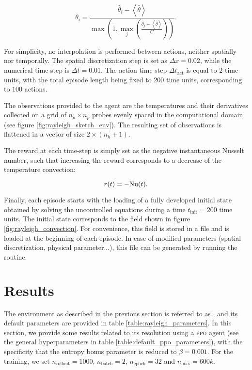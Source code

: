 \begin{equation}
	\theta_i = \frac{\hat{\theta}_i - \left< \hat{\theta} \right>}{\max \left( 1, \max_j \left( \frac{\hat{\theta}_j - \left< \hat{\theta} \right>}{C} \right) \right)}.
\end{equation}

For simplicity, no interpolation is performed between actions, neither spatially nor temporally. The spatial discretization step is set as $\Delta x = 0.02$, while the numerical time step is $\Delta t = 0.01$. The action time-step $\Delta t_\text{act}$ is equal to $2$ time units, with the total episode length being fixed to $200$ time units, corresponding to $100$ actions.



The observations provided to the agent are the temperatures and their derivatives collected on a grid of $n_p \times n_p$ probes evenly spaced in the computational domain (see figure \ref{fig:rayleigh_sketch_env}). The resulting set of observations is flattened in a vector of size $2 \times (n_h+1)$.

The reward at each time-step is simply set as the negative instantaneous Nusselt number, such that increasing the reward corresponds to a decrease of the temperature convection:

\begin{equation}
	r(t) = - \text{Nu} (t).
\end{equation}

Finally, each episode starts with the loading of a fully developed initial state obtained by solving the uncontrolled equations during a time $t_\text{init} = 200$ time units. The initial state corresponds to the field shown in figure \ref{fig:rayleigh_convection}. For convenience, this field is stored in a file and is loaded at the beginning of each episode. In case of modified parameters (spatial discretization, physical parameter...), this file can be generated by running the  routine.

\section{Results}

The environment as described in the previous section is referred to as , and its default parameters are provided in table \ref{table:rayleigh_parameters}. In this section, we provide some results related to its resolution using a \textsc{ppo} agent (see the general hyperparameters in table \ref{table:default_ppo_parameters}), with the specificity that the entropy bonus parameter is reduced to $\beta = 0.001$. For the training, we set $n_\text{rollout} = 1000$, $n_\text{batch} = 2$, $n_\text{epoch} = 32$ and $n_\text{max} = 600k$.

